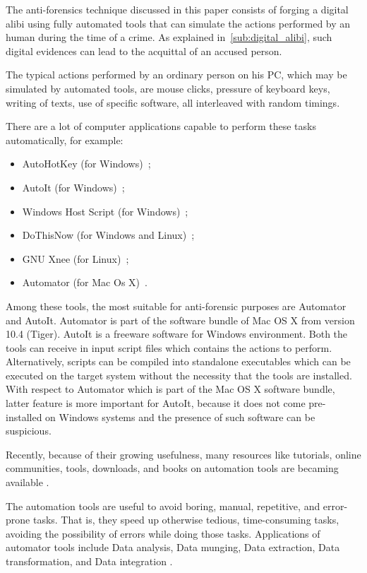 \documentclass[runningheads,english]{llncs}
\begin{document}
The anti-forensics technique discussed in this paper consists of forging a
digital alibi using fully automated tools that can simulate the actions
performed by an human during the time of a crime. As explained
in~\ref{sub:digital_alibi}, such digital evidences can lead to the acquittal of
an accused person.

The typical actions performed by an ordinary person on his PC, which may be
simulated by automated tools, are mouse clicks, pressure of keyboard keys,
writing of texts, use of specific software, all interleaved with random timings.

There are a lot of computer applications capable to perform these tasks
automatically, for example:
\begin{itemize}
\item AutoHotKey (for Windows)~\cite{autohotkey};
\item AutoIt (for Windows)~\cite{autoit};
\item Windows Host Script (for Windows)~\cite{wsh};
\item DoThisNow (for Windows and Linux)~\cite{dothisnow};
\item GNU Xnee (for Linux)~\cite{xnee};
\item Automator (for Mac Os X)~\cite{automator}.
\end{itemize}

Among these tools, the most suitable for anti-forensic purposes are Automator
and AutoIt. Automator is part of the software bundle of Mac OS X from version
10.4 (Tiger). AutoIt is a freeware software for Windows environment. Both the
tools can receive in input script files which contains the actions to perform.
Alternatively, scripts can be compiled into standalone executables which can be
executed on the target system without the necessity that the tools are
installed. With respect to Automator which is part of the Mac OS X software
bundle, latter feature is more important for AutoIt, because it does not come
pre-installed on Windows systems and the presence of such software can be
suspicious. 

Recently, because of their growing usefulness, many resources like tutorials,
online communities, tools, downloads, and books on automation tools are becaming
available \cite{Myer}.

The automation tools are useful to avoid boring, manual, repetitive, and
error-prone tasks.
That is, they speed up otherwise tedious, time-consuming tasks,
avoiding the possibility of errors while doing those tasks.
Applications of automator tools include Data analysis, Data munging, Data
extraction, Data transformation, and Data integration \cite{Myer}.
\end{document}
